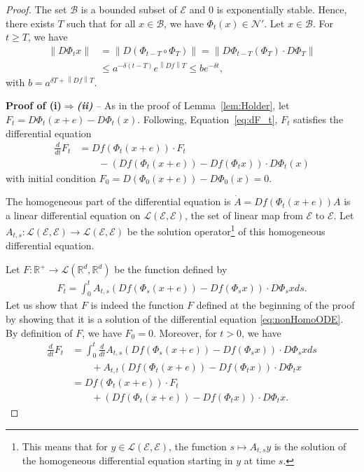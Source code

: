 \documentclass[sigconf]{acmart}
\newcommand\E{\mathcal{E}}
\newcommand\R{\mathbb{R}}
\newcommand\calL{\mathcal{L}}
\newcommand\calB{\mathcal{B}}
\newcommand\calN{\mathcal{N}}
\newcommand\norm[1]{\left\|#1\right\|}
\newcommand\dt{\frac{d}{dt}}
\newcommand\p[1]{\left(#1\right)}
\begin{document}
\begin{proof}
  The set $\calB$ is a bounded subset of $\E$ and $0$ is exponentially
  stable. Hence, there exists $T$ such that for all $x\in\calB$, we
  have $\Phi_t(x)\in \calN'$.  Let $x\in\calB$. For $t\ge T$, we have
  \begin{align*}
    \norm{D\Phi_tx} &= \norm{ D(\Phi_{t-T}\circ\Phi_{T})}
    =\norm{ D\Phi_{t-T}(\Phi_{T}) \cdot D\Phi_{T}}\\
                    &\le a^{-\delta(t-T)}e^{\norm{Df}T}
    \le b e^{-\delta t},
  \end{align*}
  with $b=a^{\delta T + \norm{Df}T}$.
  
  \textbf{Proof of (i)$\Rightarrow$\emph{(ii)}} -- As in the proof of
  Lemma~\ref{lem:Holder}, let $F_t=D\Phi_t(x+e)-D\Phi_t(x)$.
  Following, Equation~\eqref{eq:dF_t}, $F_t$ satisfies the
  differential equation
  \begin{align}
    \dt F_t &= Df (\Phi_t(x+e))\cdot F_t \nonumber\\
            &\qquad -\p{Df(\Phi_t(x+e))-Df(\Phi_tx)}\cdot D\Phi_t(x)
              \label{eq:nonHomoODE}
  \end{align}
  with initial condition $F_0=D(\Phi_0(x+e))-D\Phi_0(x)=0$. 
  
  The homogeneous part of the differential equation is
  $\dot{A} = Df(\Phi_t(x+e)) A$ is a linear differential equation on
  $\calL(\E,\E)$, the set of linear map from $\E$ to $\E$. Let
  $A_{t,s}:\calL(\E,\E)\to \calL(\E,\E)$ be the solution
  operator\footnote{This means that for $y\in\calL(\E,\E)$, the
    function $s\mapsto A_{t,s}y$ is the solution of the homogeneous
    differential equation starting in $y$ at time $s$.} of this
  homogeneous differential equation.
  
  Let $F:\R^+\to\calL(\R^d,\R^d)$ be the function defined by
  \begin{align*}
    F_t = \int_0^t A_{t,s}\p{Df(\Phi_s(x+e))-Df(\Phi_sx)}\cdot
    D\Phi_sxds.
  \end{align*}
  Let us show that $F$ is indeed the function $F$ defined at the
  beginning of the proof by showing that it is a solution of the
  differential equation \eqref{eq:nonHomoODE}. By definition of $F$,
  we have $F_0=0$. Moreover, for $t>0$, we have 
  \begin{align*}
    \dt F_t &= \int_0^t \dt A_{t,s}\p{Df(\Phi_s(x+e))-Df(\Phi_sx)}\cdot 
              D\Phi_s xds \\
            &\qquad +  A_{t,t} \p{Df(\Phi_t(x+e))-Df(\Phi_tx)}\cdot D\Phi_t x\\
            &= Df(\Phi_t(x+e)) \cdot F_t \\
            &\qquad +  \p{Df(\Phi_t(x+e))-Df(\Phi_tx)}\cdot
              D\Phi_tx. 
  \end{align*}
  

\end{proof}
\end{document}
